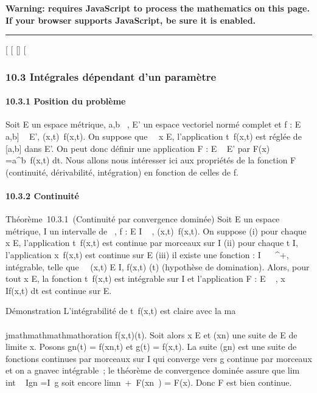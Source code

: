 \textbf{Warning: 
requires JavaScript to process the mathematics on this page.\\ If your
browser supports JavaScript, be sure it is enabled.}

\begin{center}\rule{3in}{0.4pt}\end{center}

{[}
{[}
{[}{]}
{[}

\subsubsection{10.3 Intégrales dépendant d'un paramètre}

\paragraph{10.3.1 Position du problème}

Soit E un espace métrique, a,b \in {}~, E' un espace vectoriel normé complet
et f : E \times {[}a,b{]} \rightarrow~ E', (x,t)\mapsto~f(x,t). On
suppose que \forall~~x \in E, l'application
t\mapsto~f(x,t) est réglée de {[}a,b{]} dans E'. On
peut donc définir une application F : E \rightarrow~ E' par F(x)
=\int  a^b~f(x,t) dt. Nous allons
nous intéresser ici aux propriétés de la fonction F (continuité,
dérivabilité, intégration) en fonction de celles de f.

\paragraph{10.3.2 Continuité}

Théorème~10.3.1~(Continuité par convergence dominée) Soit E un espace
métrique, I un intervalle de ~, f : E \times I \rightarrow~ ,
(x,t)\mapsto~f(x,t). On suppose (i) pour chaque x \in
E, l'application t\mapsto~f(x,t) est continue par
morceaux sur I (ii) pour chaque t \in I, l'application
x\mapsto~f(x,t) est continue sur E (iii) il existe
une fonction \phi : I \rightarrow~ ~^+, intégrable, telle que
\forall~~(x,t) \in E \times I, \textbar{}f(x,t)\textbar{}\leq
\phi(t) (hypothèse de domination). Alors, pour tout x \in E, la fonction
t\mapsto~f(x,t) est intégrable sur I et
l'application F : E \rightarrow~ ,
x\mapsto~\int ~
If(x,t) dt est continue sur E.

Démonstration L'intégrabilité de t\mapsto~f(x,t) est
claire avec la ma\\\\jmathmathmathmathoration \textbar{}f(x,t)\textbar{}\leq \phi(t). Soit alors x
\in E et (xn) une suite de E de limite x. Posons gn(t)
= f(xn,t) et g(t) = f(x,t). La suite (gn) est une
suite de fonctions continues par morceaux sur I qui converge vers g
continue par morceaux et on a \textbar{}gn\textbar{}\leq \phi avec \phi
intégrable~; le théorème de convergence dominée assure que
lim\\int ~
Ign =\int  I~g soit
encore limn\rightarrow~+\infty~F(xn~) =
F(x). Donc F est bien continue.

